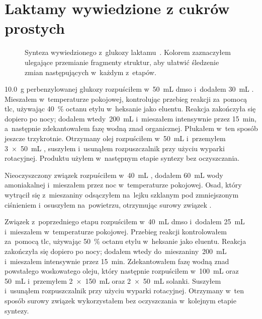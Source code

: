 \section{Laktamy wywiedzione z cukrów prostych}\label{experimental:lactams}
\begin{figure}
  
  \caption{
    Synteza wywiedzionego z~glukozy laktamu~.
    Kolorem zaznaczyłem ulegające przemianie fragmenty struktur,
      aby ułatwić śledzenie zmian następujących w~każdym z~etapów.
  } \label{sch:gluco-synthesis}
\end{figure}
\SI{10.0}{\gram} perbenzylowanej glukozy rozpuściłem w~\SI{50}{\mL} \gls{dmso}
  i~dodałem \SI{30}{\mL} .
Mieszałem w~temperaturze pokojowej, kontrolując przebieg reakcji za~pomocą \gls{tlc},
  używając \SI{40}{\percent} octanu etylu w~heksanie jako eluentu.
Reakcja zakończyła się dopiero po nocy; dodałem wtedy~\SI{200}{\mL}  i~mieszałem
  intensywnie przez \SI{15}{\minute}, a~następnie zdekantowałem fazę wodną znad organicznej.
Płukałem w~ten sposób jeszcze trzykrotnie.
Otrzymany olej rozpuściłem w~\SI{50}{\mL}  i~przemyłem 
  \SI[product-units = single]{3 x 50}{\mL} , suszyłem  i~usunąłem rozpuszczalnik
  przy użyciu wyparki rotacyjnej.
Produktu użyłem w~następnym etapie syntezy bez oczyszczania.

Nieoczyszczony związek  rozpuściłem w~\SI{40}{\mL} ,
  dodałem \SI{60}{\mL} wody amoniakalnej i~mieszałem przez noc w~temperaturze pokojowej.
Osad, który wytrącił się z~mieszaniny odsączyłem na~lejku szklanym pod zmniejszonym ciśnieniem
  i~osuszyłem na~powietrzu, otrzymując surowy związek .

Związek  z~poprzedniego etapu rozpuściłem w~\SI{40}{\mL} \gls{dmso}
  i~dodałem \SI{25}{\mL}  i~mieszałem w~temperaturze pokojowej.
Przebieg reakcji kontrolowałem za~pomocą \gls{tlc},
  używając \SI{50}{\percent} octanu etylu w~heksanie jako eluentu.
Reakcja zakończyła się dopiero po nocy; dodałem wtedy do~mieszaniny~\SI{200}{\mL} 
  i~mieszałem intensywnie przez \SI{15}{\minute}.
Zdekantowałem fazę wodną znad powstałego woskowatego oleju, który następnie rozpuściłem
  w~\SI{100}{\mL}  oraz \SI{50}{\mL}  i~przemyłem
  \SI[product-units = single]{2 x 150}{\mL}  oraz
  \SI[product-units = single]{2 x 50}{\mL} solanki.
Suszyłem  i~usunąłem rozpuszczalnik przy użyciu wyparki rotacyjnej.
Otrzymany w~ten sposób surowy związek  wykorzystałem bez oczyszczania
  w~kolejnym etapie syntezy.

